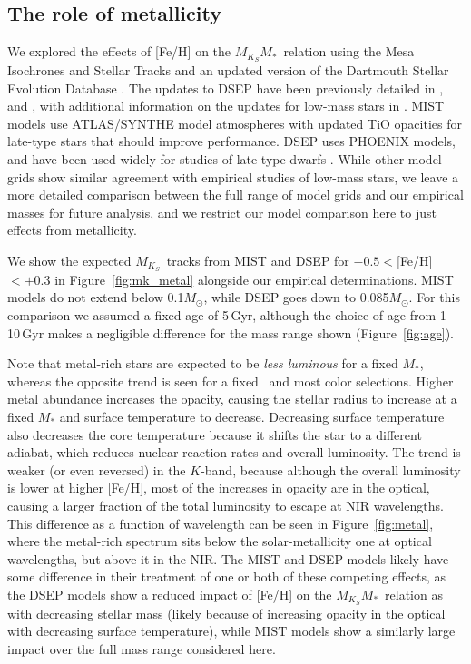 \documentclass[twocolumn]{aastex62}
\newcommand{\mks}{$M_{K_S}$}
\newcommand{\mmk}{$M_{K_S}$\textendash$M_*$}
\begin{document}
\subsection{The role of metallicity}\label{sec:metal}

We explored the effects of [Fe/H] on the \mmk\ relation using the Mesa Isochrones and Stellar Tracks \citep[MIST,][]{MIST0,MIST1} and an updated version of the Dartmouth Stellar Evolution Database \citep[DSEP,][]{Dotter2008}. The updates to DSEP have been previously detailed in \citet{Feiden2013,Feiden2014a}, and \citet{Muirhead2014}, with additional information on the updates for low-mass stars in \citet{Mann2015b}. MIST models use ATLAS/SYNTHE model atmospheres \citep{2004astro.ph..5087C} with updated TiO opacities for late-type stars that should improve performance. DSEP uses PHOENIX \cite{Hauschildt1999,1999ApJ...525..871H} models, and have been used widely for studies of late-type dwarfs \citep[e.g.,][]{Boyajian2012,2015MNRAS.454..593B,Kesseli:2018aa}. While other model grids \citep[e.g.,YaPSI, PARSEC, Lyon][]{Spada2013,Chen2014,BHAC15} show similar agreement with empirical studies of low-mass stars, we leave a more detailed comparison between the full range of model grids and our empirical masses for future analysis, and we restrict our model comparison here to just effects from metallicity. 

We show the expected \mks\ tracks from MIST and DSEP for $-0.5<$[Fe/H]$<+0.3$ in Figure~\ref{fig:mk_metal} alongside our empirical determinations. MIST models do not extend below 0.1$M_\odot$, while DSEP goes down to 0.085$M_\odot$. For this comparison we assumed a fixed age of 5\,Gyr, although the choice of age from 1-10\,Gyr makes a negligible difference for the mass range shown (Figure~\ref{fig:age}). 

Note that metal-rich stars are expected to be {\it less luminous} for a fixed $M_*$, whereas the opposite trend is seen for a fixed \teff\ and most color selections. Higher metal abundance increases the opacity, causing the stellar radius to increase at a fixed $M_*$ and surface temperature to decrease. Decreasing surface temperature also decreases the core temperature because it shifts the star to a different adiabat, which reduces nuclear reaction rates and overall luminosity. The trend is weaker (or even reversed) in the $K$-band, because although the overall luminosity is lower at higher [Fe/H], most of the increases in opacity are in the optical, causing a larger fraction of the total luminosity to escape at NIR wavelengths. This difference as a function of wavelength can be seen in Figure~\ref{fig:metal}, where the metal-rich spectrum sits below the solar-metallicity one at optical wavelengths, but above it in the NIR. The MIST and DSEP models likely have some difference in their treatment of one or both of these competing effects, as the DSEP models show a reduced impact of [Fe/H] on the \mmk\ relation as with decreasing stellar mass (likely because of increasing opacity in the optical with decreasing surface temperature), while MIST models show a similarly large impact over the full mass range considered here. 
\end{document}

